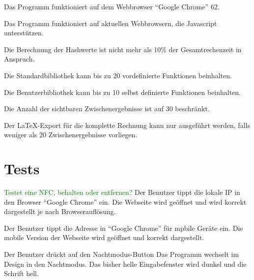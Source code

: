 \documentclass[parskip=full,11pt,twoside]{scrartcl}
\begin{document}
Das Programm funktioniert auf dem Webbrowser \enquote{Google Chrome} 62.

Das Programm funktioniert auf aktuellen Webbrowsern, die Javascript unterstützen.

Die Berechnung der Hashwerte ist nicht mehr als 10\% der Gesamtrechenzeit in Anspruch.

Die Standardbibliothek kann bis zu 20 vordefinierte Funktionen beinhalten.

Die Benutzerbibliothek kann bis zu 10 selbst definierte Funktionen beinhalten.

Die Anzahl der sichtbaren Zwischenergebnisse ist auf 30 beschränkt.

Der LaTeX-Export für die komplette Rechnung kann nur ausgeführt werden, falls weniger als 20 Zwischenergebnisse vorliegen.



\newpage
\section{Tests}

\textcolor{green}{Testet eine NFC, behalten oder entfernen?}
{Der Benutzer tippt die lokale IP in den Browser \enquote {Google Chrome} ein.}
{Die Webseite wird geöffnet und wird korrekt dargestellt je nach Browserauflösung.}

{Der Benutzer tippt die Adresse in \enquote{Google Chrome} für mpbile Geräte ein.}
{Die mobile Version der Webseite wird geöffnet und korrekt dargestellt.}

{Der Benutzer drückt auf den Nachtmodus-Button}
{Das Programm wechselt im Design in den Nachtmodus. Das bisher helle Eingabefenster wird dunkel und die Schrift hell.}


\end{document}

